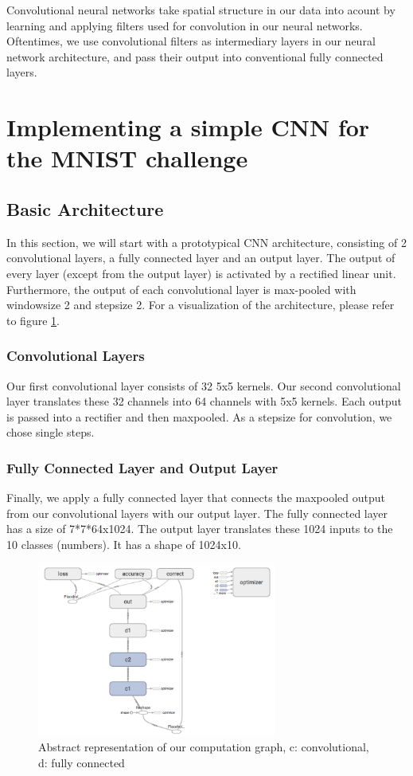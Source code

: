 \documentclass{article}
\begin{document}
Convolutional neural networks take spatial structure in our data into acount by learning and applying filters used for convolution in our neural networks. Oftentimes, we use convolutional filters as intermediary layers in our neural network architecture, and pass their output into conventional fully connected layers.

\section{Implementing a simple CNN for the MNIST challenge}
\subsection{Basic Architecture}
In this section, we will start with a prototypical CNN architecture, consisting of 2 convolutional layers, a fully connected layer and an output layer. The output of every layer (except from the output layer) is activated by a rectified linear unit. Furthermore, the output of each convolutional layer is max-pooled with windowsize 2 and stepsize 2. For a visualization of the architecture, please refer to figure \ref{std_graph}.

\subsubsection*{Convolutional Layers}
Our first convolutional layer consists of 32 5x5 kernels. Our second convolutional layer translates these 32 channels into 64 channels with 5x5 kernels. Each output is passed into a rectifier and then maxpooled. As a stepsize for convolution, we chose single steps.

\subsubsection*{Fully Connected Layer and Output Layer}
Finally, we apply a fully connected layer that connects the maxpooled output from our convolutional layers with our output layer. The fully connected layer has a size of 7*7*64x1024. The output layer translates these 1024 inputs to the 10 classes (numbers). It has a shape of 1024x10.

\begin{figure}
\centering
\includegraphics[width=0.7\textwidth]{imgs/std_graph.png}
\caption{Abstract representation of our computation graph, c: convolutional, d: fully connected}\label{std_graph}
\end{figure}
\end{document}
